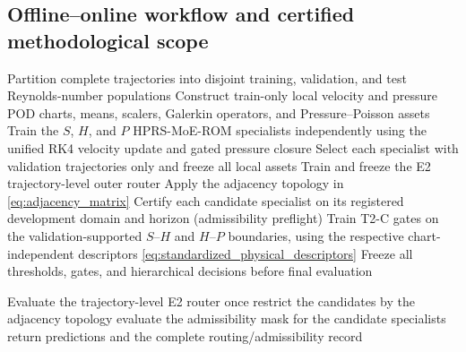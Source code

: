 \subsection{Offline--online workflow and certified methodological scope}
\label{subsec:offline_online_scope}

\begin{algorithm}[H]
  \caption{Offline construction of RAL-MoE-ROM}
  \label{alg:ral_moe_offline}
  Partition complete trajectories into disjoint training, validation, and
  test Reynolds-number populations\;
  Construct train-only local velocity and pressure POD charts, means,
  scalers, Galerkin operators, and Pressure--Poisson assets\;
  Train the $S$, $H$, and $P$ HPRS-MoE-ROM specialists independently
  using the unified RK4 velocity update and gated pressure closure\;
  Select each specialist with validation trajectories only and freeze all
  local assets\;
  Train and freeze the E2 trajectory-level outer router\;
  Apply the adjacency topology in \eqref{eq:adjacency_matrix}\;
  Certify each candidate specialist on its registered development domain and
  horizon (admissibility preflight)\;
  Train T2-C gates on the validation-supported $S$--$H$ and $H$--$P$
  boundaries, using the respective chart-independent descriptors
  \eqref{eq:standardized_physical_descriptors}\;
  Freeze all thresholds, gates, and hierarchical decisions before final
  evaluation\;
\end{algorithm}

\begin{algorithm}[H]
  \caption{Hierarchical online prediction with RAL-MoE-ROM}
  \label{alg:ral_moe_online}
  Evaluate the trajectory-level E2 router once\;
  restrict the candidates by the adjacency topology\;
  evaluate the admissibility mask for the candidate specialists\;
  return predictions and the complete routing/admissibility record\;
\end{algorithm}

